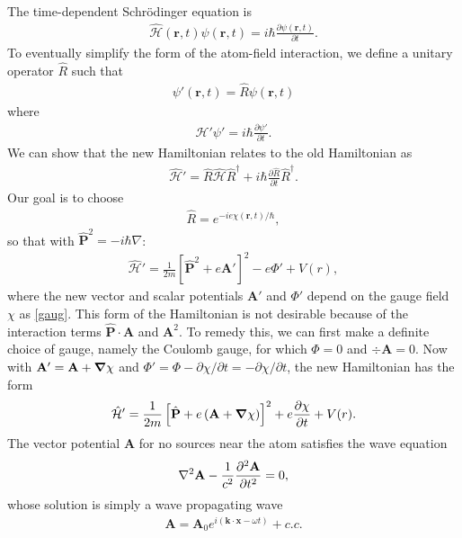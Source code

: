 \documentclass{book}
\theoremstyle{definition}
\newcommand{\p}{\partial}
\newcommand{\ham}{\mathcal{H}}
\newcommand{\f}[2]{\frac{#1}{#2}}
\newcommand{\lp}{\left(}
\newcommand{\rp}{\right)}
\newcommand{\lb}{\left[}
\newcommand{\rb}{\right]}
\begin{document}
The time-dependent Schr\"{o}dinger equation is
\begin{align}
\hat{\ham}(\mathbf{r},t)\psi(\mathbf{r},t) = i\hbar\f{\p \psi(\mathbf{r},t)}{\p t}.
\end{align}
To eventually simplify the form of the atom-field interaction, we define a unitary operator $\hat{R}$ such that
\begin{align}
\psi'(\mathbf{r},t) = \hat{R}\psi(\mathbf{r},t)
\end{align}
where
\begin{align}
\hat{\ham}' \psi'  = i\hbar \f{\p \psi'}{\p t}.
\end{align}
We can show that the new Hamiltonian relates to the old Hamiltonian as 
\begin{align}
\hat{\ham}' = \hat{R}\hat{\ham}\hat{R}^\dagger + i\hbar \f{\p \hat{R}}{\p t}\hat{R}^\dagger.
\end{align}
Our goal is to choose 
\begin{align}
\hat{R} = e^{-ie\chi(\mathbf{r},t)/\hbar},
\end{align}
so that with $\hat{\mathbf{P}}^2 = -i\hbar \nabla$:
\begin{align}
\hat{\ham}' =\f{1}{2m}\lb \hat{\mathbf{P}}^2 + e\mathbf{A}' \rb^2 - e\Phi' + V(r),
\end{align}
where the new vector and scalar potentials $\mathbf{A}'$ and $\Phi'$ depend on the gauge field $\chi$ as \eqref{gaug}. This form of the Hamiltonian is not desirable because of the interaction terms $\hat{\mathbf{P}} \cdot \mathbf{A}$ and $\mathbf{A}^2$. To remedy this, we can first make a definite choice of gauge, namely the Coulomb gauge, for which $\Phi = 0$ and $\div{\mathbf{A}} = 0$. Now with $\mathbf{A'} = \mathbf{A} + \grad{\chi}$ and $\Phi' = \Phi - \p \chi / \p t = - \p \chi / \p t$, the new Hamiltonian has the form
\begin{align}\label{newHam}
\hat{\ham}' = \f{1}{2m}\lb \hat{\mathbf{P}} + e\lp\mathbf{A} + \grad{\chi}\rp \rb^2 + e\f{\p \chi}{\p t} +V(r).
\end{align}
The vector potential $\mathbf{A}$ for no sources near the atom satisfies the wave equation
\begin{align}
\laplacian{\mathbf{A}} - \f{1}{c^2}\f{\p^2 \mathbf{A}}{\p t^2} = 0,
\end{align}
whose solution is simply a wave propagating wave
\begin{align}
\mathbf{A} = \mathbf{A}_0 e^{i(\mathbf{k}\cdot\mathbf{x} - \omega t)} + c.c.
\end{align}
\end{document}
